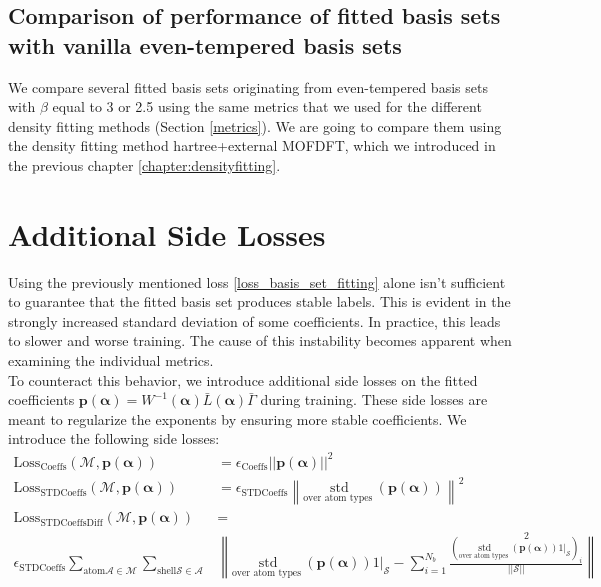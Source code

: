 {\subsection{Comparison of performance of fitted basis sets with vanilla even-tempered basis sets}
We compare several fitted basis sets originating from even-tempered basis sets with $\beta$ equal to 3 or 2.5 using the same metrics that we used for the different density fitting methods (Section \ref{metrics}). We are going to compare them using the density fitting method hartree+external MOFDFT, which we introduced in the previous chapter \ref{chapter:densityfitting}.
\section{Additional Side Losses}
Using the previously mentioned loss \ref{loss_basis_set_fitting} alone isn't sufficient to guarantee that the fitted basis set produces stable labels. This is evident in the strongly increased standard deviation of some coefficients. In practice, this leads to slower and worse training. The cause of this instability becomes apparent when examining the individual metrics.\\
To counteract this behavior, we introduce additional side losses on the fitted coefficients $\mathbf{p}(\mathbf{\alpha}) = W^{-1}(\mathbf{\alpha}) \bar L(\mathbf{\alpha}) \bar \Gamma$ during training. These side losses are meant to regularize the exponents by ensuring more stable coefficients. We introduce the following side losses:
 \begin{align}
    \text{Loss}_\text{Coeffs}(\mathcal{M},\mathbf{p}(\mathbf{\alpha})) &= \epsilon_\text{Coeffs}||\mathbf{p}(\mathbf{\alpha})||^2\\
    \text{Loss}_\text{STDCoeffs}(\mathcal{M},\mathbf{p}(\mathbf{\alpha})) &= \epsilon_\text{STDCoeffs}\left\lVert\underset{\text{over atom types }}{\text{std}}(\mathbf{p}(\mathbf{\alpha}))\right\rVert^2\\
    \text{Loss}_\text{STDCoeffsDiff}(\mathcal{M},\mathbf{p}(\mathbf{\alpha})) &=\label{sideloss3}\\ \nonumber\epsilon_\text{STDCoeffs}\sum\limits_{\text{atom} \mathcal{A}\in \mathcal{M}}\sum\limits_{\text{shell} \mathcal{S}\in \mathcal{A}}&\left\lVert \underset{\text{over atom types }}{\text{std}}(\mathbf{p}(\mathbf{\alpha}))1|_{\mathcal{S}}-\sum\limits_{i=1}^{N_b}\frac{\left(\underset{\text{over atom types }}{\text{std}}(\mathbf{p}(\mathbf{\alpha}))1|_{\mathcal{S}}\right)_i}{||\mathcal{S}||}\right\rVert^2

\end{align}}
